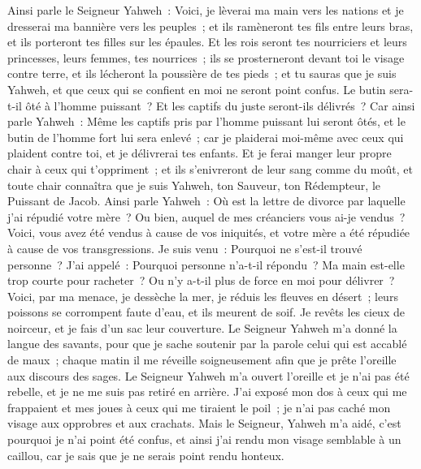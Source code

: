 \begin{multicols}{2}
Ainsi parle le Seigneur Yahweh~: Voici, je lèverai ma main vers les nations et je dresserai ma bannière vers les peuples~; et ils ramèneront tes fils entre leurs bras, et ils porteront tes filles sur les épaules.
Et les rois seront tes nourriciers et leurs princesses, leurs femmes, tes nourrices~; ils se prosterneront devant toi le visage contre terre, et ils lécheront la poussière de tes pieds~; et tu sauras que je suis Yahweh, et que ceux qui se confient en moi ne seront point confus.
Le butin sera-t-il ôté à l'homme puissant~? Et les captifs du juste seront-ils délivrés~?
Car ainsi parle Yahweh~: Même les captifs pris par l'homme puissant lui seront ôtés, et le butin de l'homme fort lui sera enlevé~; car je plaiderai moi-même avec ceux qui plaident contre toi, et je délivrerai tes enfants.
Et je ferai manger leur propre chair à ceux qui t'oppriment~; et ils s'enivreront de leur sang comme du moût, et toute chair connaîtra que je suis Yahweh, ton Sauveur, ton Rédempteur, le Puissant de Jacob.
\VerseOne{}Ainsi parle Yahweh~: Où est la lettre de divorce par laquelle j'ai répudié votre mère~? Ou bien, auquel de mes créanciers vous ai-je vendus~? Voici, vous avez été vendus à cause de vos iniquités, et votre mère a été répudiée à cause de vos transgressions.
Je suis venu~: Pourquoi ne s'est-il trouvé personne~? J'ai appelé~: Pourquoi personne n'a-t-il répondu~? Ma main est-elle trop courte pour racheter~? Ou n'y a-t-il plus de force en moi pour délivrer~? Voici, par ma menace, je dessèche la mer, je réduis les fleuves en désert~; leurs poissons se corrompent faute d'eau, et ils meurent de soif.
Je revêts les cieux de noirceur, et je fais d'un sac leur couverture.
Le Seigneur Yahweh m'a donné la langue des savants, pour que je sache soutenir par la parole celui qui est accablé de maux~; chaque matin il me réveille soigneusement afin que je prête l'oreille aux discours des sages.
Le Seigneur Yahweh m'a ouvert l'oreille et je n'ai pas été rebelle, et je ne me suis pas retiré en arrière.
J'ai exposé mon dos à ceux qui me frappaient et mes joues à ceux qui me tiraient le poil~; je n'ai pas caché mon visage aux opprobres et aux crachats.
Mais le Seigneur, Yahweh m'a aidé, c'est pourquoi je n'ai point été confus, et ainsi j'ai rendu mon visage semblable à un caillou, car je sais que je ne serais point rendu honteux.

\end{multicols}

